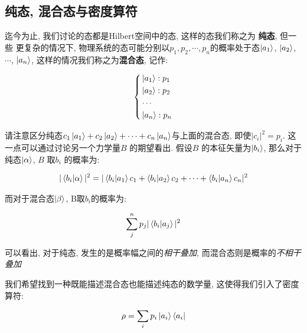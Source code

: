 \subsection{纯态, 混合态与密度算符}

迄今为止, 我们讨论的态都是Hilbert空间中的态, 这样的态我们称之为 {\bf 纯态}, 但一些
更复杂的情况下, 物理系统的态可能分别以$p_1, p_2, \cdots, p_{n}$的概率处于态$\ket{a_1}$, $\ket{a_2}$,$\cdots$, $\ket{a_{n}}$,
这样的情况我们称之为{\bf 混合态}, 记作:

\begin{equation}
  \left\{
    \begin{aligned}
      &\ket{a_1}: p_1 \\
      &\ket{a_2}: p_2 \\
      &\cdots \\
      &\ket{a_n}: p_{n}
    \end{aligned}
  \right.
\end{equation}

\begin{remark}
  请注意区分纯态$c_1\ket{a_1} + c_2\ket{a_2}+\cdots+c_{n}\ket{a_{n}}$与上面的混合态,
  即使$|c_{i}|^{2} = p_{i}$. 这一点可以通过讨论另一个力学量$B$ 的期望看出.
  假设$B$ 的本征矢量为$\ket{b_i}$, 那么对于纯态$\ket{\alpha}$,  $B$ 取$b_{i}$ 的概率为:
  
  \begin{equation}
    \begin{aligned}
      |\bra{b_{i}}\ket{\alpha}|^{2} = |\bra{b_{i}}\ket{a_1}c_1 + \bra{b_{i}}\ket{a_2}c_2 + \cdots + \bra{b_{i}}\ket{a_{n}}c_{n}|^{2}
    \end{aligned}
  \end{equation}

  而对于混合态$\ket{\beta}$, B取$b_{i}$的概率为:

  \begin{equation}
    \begin{aligned}
      \sum_{j}^{n} p_{j} |\bra{b_{i}}\ket{a_{j}}|^{2}
    \end{aligned}
  \end{equation}

  可以看出, 对于纯态, 发生的是概率幅之间的\emph{相干叠加}, 而混合态则是概率的\emph{不相干叠加}
\end{remark}

我们希望找到一种既能描述混合态也能描述纯态的数学量, 这使得我们引入了密度算符:

\begin{equation}
  \begin{aligned}
    \rho = \sum_{i} p_{i} \ket{a_{i}}\bra{a_{i}}
  \end{aligned}
\end{equation}

